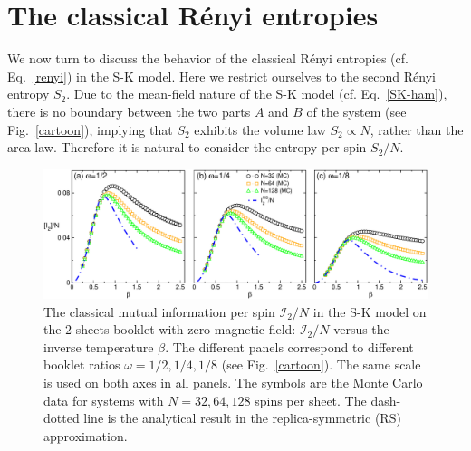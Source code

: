 \documentclass[twocolumn,superscriptaddress,prb,10pt]{revtex4-1}
\begin{document}
\section{The classical R\'enyi entropies}
\label{Renyi-section}

We now turn to discuss the behavior of the classical R\'enyi entropies (cf. 
Eq.~\eqref{renyi}) in the S-K model. Here we restrict ourselves to the second R\'enyi 
entropy $S_2$. Due to the mean-field nature of the S-K model (cf. Eq.~\eqref{SK-ham}), 
there is no boundary between the two parts $A$ and $B$ of the system (see Fig.~\ref{cartoon}), 
implying that $S_2$ exhibits the volume law $S_2\propto N$, rather than the area law. 
Therefore it is natural to consider the entropy per spin $S_2/N$. 

\begin{figure}[t]
\includegraphics*[width=0.93\linewidth]{./draft_figs/I2_MC_v1}
\caption{The classical mutual information per spin ${\mathcal I}_2/N$ 
 in the S-K model on the $2$-sheets booklet with zero magnetic field: 
 ${\mathcal I}_2/N$ versus the inverse temperature $\beta$. The 
 different panels correspond to different booklet ratios $\omega=1/2,1/4,1/8$ 
 (see Fig.~\ref{cartoon}). The same scale is used on both axes in all 
 panels. The symbols are the Monte Carlo data 
 for systems with $N=32,64,128$ spins per sheet. The dash-dotted line is 
 the analytical result in the replica-symmetric (RS) approximation.  
}
\label{I2-MC}
\end{figure}
\end{document}
